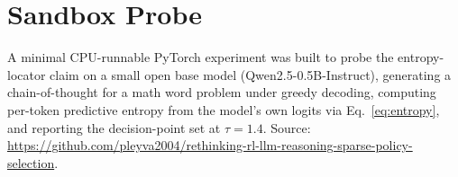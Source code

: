 \documentclass[11pt]{article}
\begin{document}
\section*{Sandbox Probe}

A minimal CPU-runnable PyTorch experiment was built to probe the entropy-locator claim on a small open base model (Qwen2.5-0.5B-Instruct), generating a chain-of-thought for a math word problem under greedy decoding, computing per-token predictive entropy from the model's own logits via Eq.~\eqref{eq:entropy}, and reporting the decision-point set at $\tau = 1.4$. Source: \url{https://github.com/pleyva2004/rethinking-rl-llm-reasoning-sparse-policy-selection}.



\end{document}
